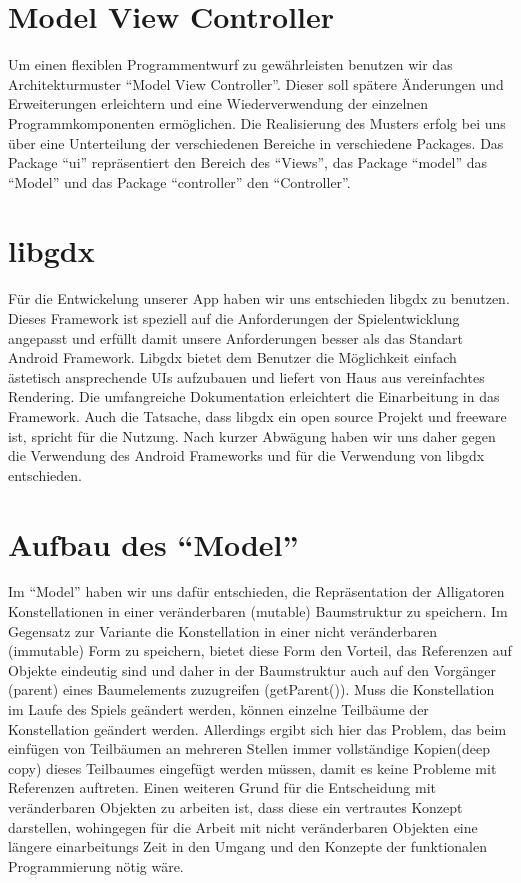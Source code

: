 \section{Model View Controller}
Um einen flexiblen Programmentwurf zu gewährleisten benutzen wir das Architekturmuster "`Model View Controller"'.
Dieser soll spätere Änderungen und Erweiterungen erleichtern und eine Wiederverwendung der einzelnen 
Programmkomponenten ermöglichen.
Die Realisierung des Musters erfolg bei uns über eine Unterteilung der verschiedenen Bereiche in verschiedene Packages. Das Package "`ui"' repräsentiert den Bereich des "`Views"', das Package
 "`model"' das "`Model"' und das Package "`controller"' den "`Controller"'.

\section{libgdx}
Für die Entwickelung unserer App haben wir uns entschieden libgdx zu benutzen. Dieses Framework ist speziell auf die Anforderungen der Spielentwicklung angepasst und erfüllt damit unsere Anforderungen besser als das Standart Android Framework. Libgdx bietet dem Benutzer die Möglichkeit einfach ästetisch ansprechende UIs aufzubauen und liefert von Haus aus vereinfachtes Rendering. Die umfangreiche Dokumentation erleichtert die
Einarbeitung in das Framework. Auch die Tatsache, dass libgdx ein open source Projekt und freeware ist, spricht für die Nutzung. Nach kurzer Abwägung haben wir uns daher gegen die Verwendung des Android Frameworks und für die Verwendung von libgdx entschieden.

\section{Aufbau des "`Model"'}
Im "`Model"' haben wir uns dafür entschieden, die Repräsentation der Alligatoren Konstellationen in einer 
veränderbaren (mutable) Baumstruktur zu speichern. Im Gegensatz zur Variante die Konstellation in einer nicht veränderbaren (immutable) Form zu speichern, bietet diese Form den Vorteil, das Referenzen auf Objekte eindeutig sind und daher in der Baumstruktur auch auf den Vorgänger (parent) eines Baumelements zuzugreifen (getParent()). Muss die Konstellation im Laufe des Spiels geändert werden, können einzelne Teilbäume der Konstellation geändert werden. Allerdings ergibt sich hier das Problem, das beim einfügen von Teilbäumen an mehreren Stellen immer vollständige Kopien(deep copy) dieses Teilbaumes eingefügt werden müssen, damit es keine Probleme mit Referenzen auftreten.
Einen weiteren Grund für die Entscheidung mit veränderbaren Objekten zu arbeiten ist, dass diese ein vertrautes Konzept darstellen, wohingegen für die Arbeit mit nicht veränderbaren Objekten eine längere einarbeitungs Zeit in den Umgang und den Konzepte der funktionalen Programmierung nötig wäre. 

